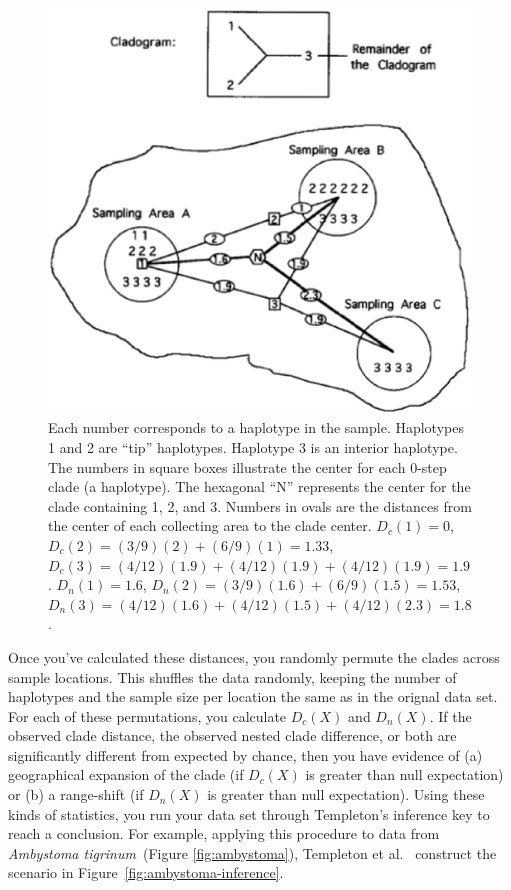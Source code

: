 \begin{figure}
\begin{center}
\includegraphics[scale=0.4]{nca-calculations.eps}
\end{center}
\caption{Each number corresponds to a haplotype in the
  sample. Haplotypes 1 and 2 are ``tip'' haplotypes. Haplotype 3 is an
  interior haplotype. The numbers in square boxes illustrate the
  center for each 0-step clade (a haplotype). The hexagonal ``N''
  represents the center for the clade containing 1, 2, and 3. Numbers
  in ovals are the distances from the center of each collecting area
  to the clade center. $D_c(1)=0$, $D_c(2)=(3/9)(2)+(6/9)(1)=1.33$,
  $D_c(3) = (4/12)(1.9) + (4/12)(1.9) + (4/12)(1.9)=1.9$. $D_n(1) =
  1.6$, $D_n(2)=(3/9)(1.6)+(6/9)(1.5)=1.53$, $D_n(3)=
  (4/12)(1.6)+(4/12)(1.5)+(4/12)(2.3)=1.8$.}\label{fig:nca-calc}
\end{figure}


Once you've calculated these distances, you randomly permute the
clades across sample locations. This shuffles the data randomly,
keeping the number of haplotypes and the sample size per location the
same as in the orignal data set. For each of these permutations, you
calculate $D_c(X)$ and $D_n(X)$. If the observed clade distance, the
observed nested clade difference, or both are significantly different
from expected by chance, then you have evidence of (a) geographical
expansion of the clade (if $D_c(X)$ is greater than null expectation)
or (b) a range-shift (if $D_n(X)$ is greater than null
expectation). Using these kinds of statistics, you run your data set
through Templeton's inference key to reach a conclusion. For example,
applying this procedure to data from {\it Ambystoma tigrinum}~(Figure
\ref{fig:ambystoma}), Templeton et al.~\cite{Templeton-etal-1995}
construct the scenario in Figure~\ref{fig:ambystoma-inference}.

